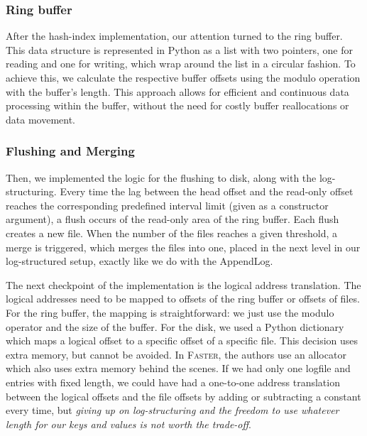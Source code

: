 \subsubsection{Ring buffer}

After the hash-index implementation, our attention turned to the ring buffer.
This data structure is represented in Python as a list with two pointers, one for reading and one for writing, which wrap around the list in a circular fashion.
To achieve this, we calculate the respective buffer offsets using the modulo operation with the buffer's length.
This approach allows for efficient and continuous data processing within the buffer, without the need for costly buffer reallocations or data movement.

\subsubsection{Flushing and Merging}

Then, we implemented the logic for the flushing to disk, along with the log-structuring. Every time the lag between the head offset and the read-only offset reaches the corresponding predefined interval limit (given as a constructor argument), a flush occurs of the read-only area of the ring buffer. Each flush creates a new file. When the number of the files reaches a given threshold, a merge is triggered, which merges the files into one, placed in the next level in our log-structured setup, exactly like we do with the AppendLog.

The next checkpoint of the implementation is the logical address translation. The logical addresses need to be mapped to offsets of the ring buffer or offsets of files. For the ring buffer, the mapping is straightforward: we just use the modulo operator and the size of the buffer. For the disk, we used a Python dictionary which maps a logical offset to a specific offset of a specific file. This decision uses extra memory, but cannot be avoided. In \textsc{Faster}, the authors use an allocator which also uses extra memory behind the scenes. If we had only one logfile and entries with fixed length, we could have had a one-to-one address translation between the logical offsets and the file offsets by adding or subtracting a constant every time, but \textit{giving up on log-structuring and the freedom to use whatever length for our keys and values is not worth the trade-off}.


